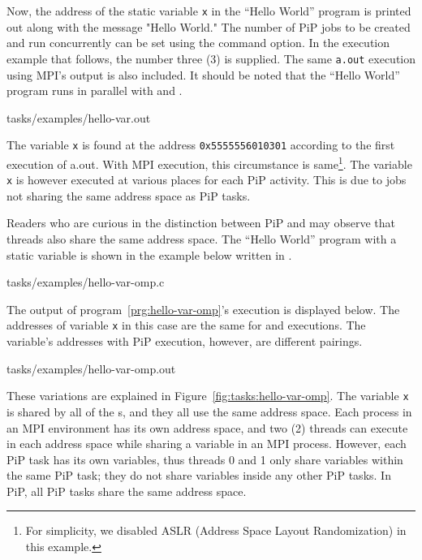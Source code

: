 Now, the address of the static variable {\tt x} in the ``Hello World''
program is printed out along with the message "Hello World." The
number of PiP jobs to be created and run concurrently can be set using
the  command option. In the execution example that
follows, the number three (3) is supplied. The same {\tt a.out}
execution using MPI's output is also included. It should be noted that
the ``Hello World'' program runs in parallel with 
and .  

 {tasks/examples/hello-var.out}

The variable {\tt x} is found at the address {\tt 0x5555556010301}
according to the first execution of a.out. With MPI execution, this
circumstance is same\footnote{For simplicity, we disabled ASLR
  (Address Space Layout Randomization) in this example.}. The variable
{\tt x} is however executed at various places for each 
PiP activity. This is due to  jobs not sharing the same address
space as PiP tasks.

Readers who are curious in the distinction between
PiP and  may observe that threads also share the same address
space. The ``Hello World'' program with a static variable is shown in
the example below written in .

 {tasks/examples/hello-var-omp.c}

The output of program~\ref{prg:hello-var-omp}'s execution is displayed
below. The addresses of variable {\tt x} in this case are the same for
 and  executions. The variable's addresses with
PiP execution, however, are different pairings.

 {tasks/examples/hello-var-omp.out}

These variations are explained in
Figure~\ref{fig:tasks:hello-var-omp}. The variable {\tt x} is shared 
by all of the s, and they all use the same address
space. Each  process in an MPI environment has its own address
space, and two (2) threads can execute in each address space while
sharing a variable in an MPI process. However, each PiP task has its
own variables, thus threads 0 and 1 only share variables within the
same PiP task; they do not share variables inside any other PiP
tasks. In PiP, all PiP tasks share the same address space.


